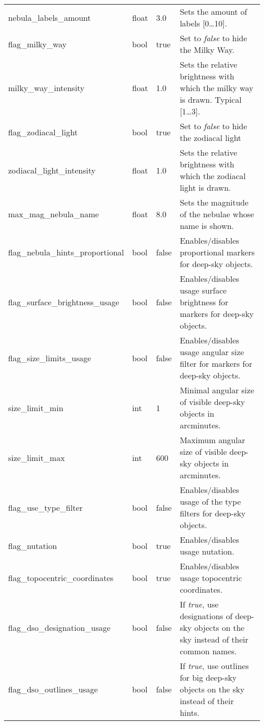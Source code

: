 \begin{longtable}{l|l|l|p{55mm}}
nebula\_labels\_amount             & float  & 3.0   & Sets the amount of labels [0\ldots10].\\%
flag\_milky\_way                   & bool   & true  & Set to \emph{false} to hide the Milky Way.\\%
milky\_way\_intensity              & float  & 1.0   & Sets the relative brightness with which the milky way is drawn. Typical [1\ldots3]. \\%
flag\_zodiacal\_light              & bool   & true  & Set to \emph{false} to hide the zodiacal light\\%
zodiacal\_light\_intensity         & float  & 1.0   & Sets the relative brightness with which the zodiacal light is drawn. \\%
max\_mag\_nebula\_name             & float  & 8.0   & Sets the magnitude of the nebulae whose name is shown. \\%
flag\_nebula\_hints\_proportional  & bool   & false & Enables/disables proportional markers for deep-sky objects. \\%
flag\_surface\_brightness\_usage   & bool   & false & Enables/disables usage surface brightness for markers for deep-sky objects.\\\midrule
%
flag\_size\_limits\_usage          & bool   & false & Enables/disables usage angular size filter for markers for deep-sky objects.\\%
size\_limit\_min                   & int    & 1     & Minimal angular size of visible deep-sky objects in arcminutes.\\%
size\_limit\_max                   & int    & 600   & Maximum angular size of visible deep-sky objects in arcminutes.\\\midrule
%
flag\_use\_type\_filter            & bool   & false & Enables/disables usage of the type filters for deep-sky objects. \\\midrule
flag\_nutation  				   & bool   & true  & Enables/disables usage nutation.\\\midrule
flag\_topocentric\_coordinates	   & bool   & true  & Enables/disables usage topocentric coordinates.\\\midrule
%
flag\_dso\_designation\_usage      & bool   & false & If \emph{true}, use designations of deep-sky objects on the sky instead of their common names.\\%
flag\_dso\_outlines\_usage         & bool   & false & If \emph{true}, use outlines for big deep-sky objects on the sky instead of their hints.\\%

\end{longtable}
